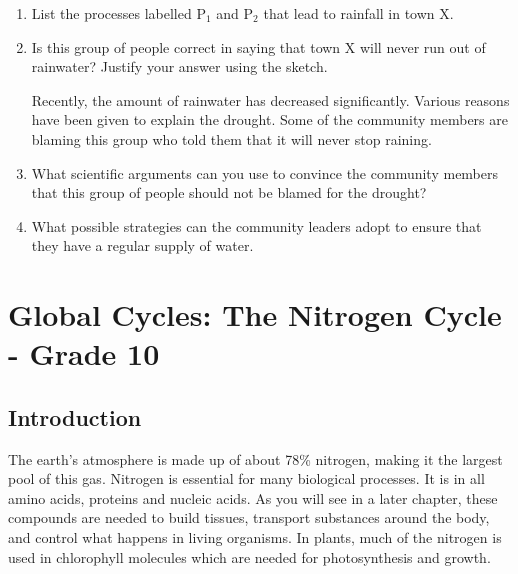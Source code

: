 {\begin{enumerate}
{	\begin{enumerate}
	\item{List the processes labelled P$_{1}$ and P$_{2}$ that lead to rainfall in town X. }
	\item{Is this group of people correct in saying that town X will never run out of rainwater? Justify your answer using the sketch.}
	
Recently, the amount of rainwater has decreased significantly. Various reasons have been given to explain the drought. Some of the community members are blaming this group who told them that it will never stop raining.

	\item{What scientific arguments can you use to convince the community members that this group of people should not be blamed for the drought?}
	\item{What possible strategies can the community leaders adopt to ensure that they have a regular supply of water.}
	\end{enumerate}
}


\end{enumerate}
}









\chapter{Global Cycles: The Nitrogen Cycle - Grade 10}
\label{chap:nitrogen}



\section{Introduction}

The earth's atmosphere is made up of about 78\% nitrogen, making it the largest pool of this gas. Nitrogen is essential for many biological processes. It is in all amino acids, proteins and nucleic acids. As you will see in a later chapter, these compounds are needed to build tissues, transport substances around the body, and control what happens in living organisms. In plants, much of the nitrogen is used in chlorophyll molecules which are needed for photosynthesis and growth.\\

